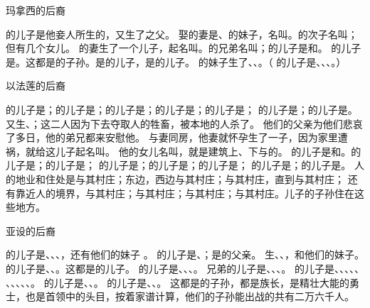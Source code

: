 {\par }{\SH 玛拿西的后裔
\par }{\PP {}的儿子{}是他妾{}人所生的，又生了{}之父{}。
娶的妻是{}、{}的妹子，名叫{}。{}的次子名叫{}；{}但有几个女儿。
的妻{}生了一个儿子，起名叫{}。{}的兄弟名叫{}；{}的儿子是{}和{}。
的儿子是{}。这都是{}的子孙。{}是{}的儿子，{}是{}的儿子。
的妹子{}生了{}、{}、{}。（
的儿子是{}、{}、{}、{}。）
\par }{\SH 以法莲的后裔
\par }{\PP {}的儿子是{}；{}的儿子是{}；{}的儿子是{}；{}的儿子是{}；{}的儿子是{}；
的儿子是{}；{}的儿子是{}。{}又生{}、{}；这二人因为下去夺取{}人的牲畜，被本地的{}人杀了。
他们的父亲{}为他们悲哀了多日，他的弟兄都来安慰他。
与妻同房，他妻就怀孕生了一子，{}因为家里遭祸，就给这儿子起名叫{}。
他的女儿名叫{}，就是建筑上{}、下{}与{}的。
的儿子是{}和{}。{}的儿子是{}；{}的儿子是{}；
的儿子是{}；{}的儿子是{}；{}的儿子是{}；
的儿子是{}；{}的儿子是{}。
人的地业和住处是{}与其村庄；东边{}，西边{}与其村庄；{}与其村庄，直到{}与其村庄；
还有靠近{}人的境界，{}与其村庄；{}与其村庄；{}与其村庄；{}与其村庄。{}儿子{}的子孙住在这些地方。
\par }{\SH 亚设的后裔
\par }{\PP {}的儿子是{}、{}、{}、{}，还有他们的妹子{}
{}。
的儿子是{}、{}；{}是{}的父亲。
生{}、{}、{}，和他们的妹子{}。
的儿子是{}、{}、{}。这都是{}的儿子。
的儿子是{}、{}、{}、{}。
兄弟{}的儿子是{}、{}、{}、{}。
的儿子是{}、{}、{}、{}、{}、
、{}、{}、{}、{}、{}。
的儿子是{}、{}、{}。
的儿子是{}、{}、{}。
这都是{}的子孙，都是族长，是精壮大能的勇士，也是首领中的头目，按着家谱计算，他们的子孙能出战的共有二万六千人。

}
